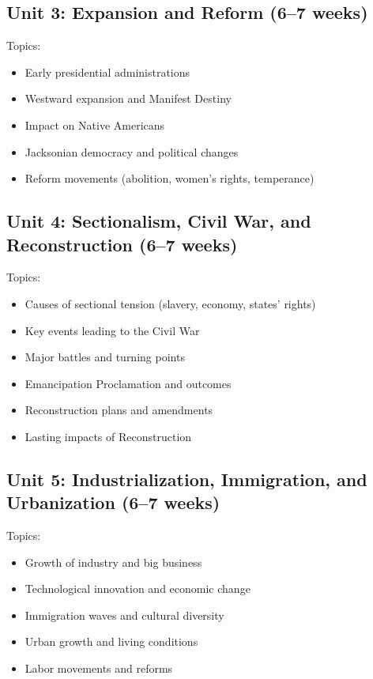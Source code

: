 \documentclass[11pt,letterpaper]{report}
\begin{document}
\subsection{Unit 3: Expansion and Reform (6–7 weeks)}

Topics:
\begin{itemize}
\item Early presidential administrations
\item Westward expansion and Manifest Destiny
\item Impact on Native Americans
\item Jacksonian democracy and political changes
\item Reform movements (abolition, women’s rights, temperance)
\end{itemize}

\subsection{Unit 4: Sectionalism, Civil War, and Reconstruction (6–7 weeks)}

Topics:
\begin{itemize}
\item Causes of sectional tension (slavery, economy, states’ rights)
\item Key events leading to the Civil War
\item Major battles and turning points
\item Emancipation Proclamation and outcomes
\item Reconstruction plans and amendments
\item Lasting impacts of Reconstruction
\end{itemize}

\subsection{Unit 5: Industrialization, Immigration, and Urbanization (6–7 weeks)}

Topics:
\begin{itemize}
\item Growth of industry and big business
\item Technological innovation and economic change
\item Immigration waves and cultural diversity
\item Urban growth and living conditions
\item Labor movements and reforms
\end{itemize}
\end{document}
